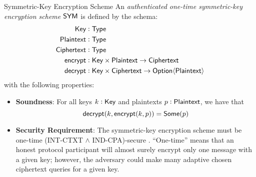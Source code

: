 \begin{definitiontoc}{Symmetric-Key Encryption Scheme} \label{def:abstract-symm}
    An \emph{authenticated one-time symmetric-key encryption scheme} ${\textsf{SYM}}$ is defined by the schema:
    \begin{align*}
        {\textsf{Key}} &: {\textsf{Type}} \\
        {\textsf{Plaintext}} &: {\textsf{Type}} \\
        {\textsf{Ciphertext}} &: {\textsf{Type}} \\
        {\textsf{encrypt}} &: {\textsf{Key}} \times {\textsf{Plaintext}} \to {\textsf{Ciphertext}} \\
        {\textsf{decrypt}} &: {\textsf{Key}} \times {\textsf{Ciphertext}} \to {\textsf{Option}}\langle{{\textsf{Plaintext}}}\rangle
    \end{align*}
    with the following properties:
    \begin{itemize}
        \item \textbf{Soundness}: For all keys $k : {\textsf{Key}}$ and plaintexts $p : {\textsf{Plaintext}}$, we have that
            \[{\textsf{decrypt}}(k, {\textsf{encrypt}}(k, p)) = {\textsf{Some}}(p)\]
        \item \textbf{Security Requirement}: The symmetric-key encryption scheme must be one-time (INT-CTXT $\land$ IND-CPA)-secure \cite{BC2000AC}. ``One-time'' means that an honest protocol participant will almost surely encrypt only one message with a given key; however, the adversary could make many adaptive chosen ciphertext queries for a given key.
    \end{itemize}
\end{definitiontoc}


